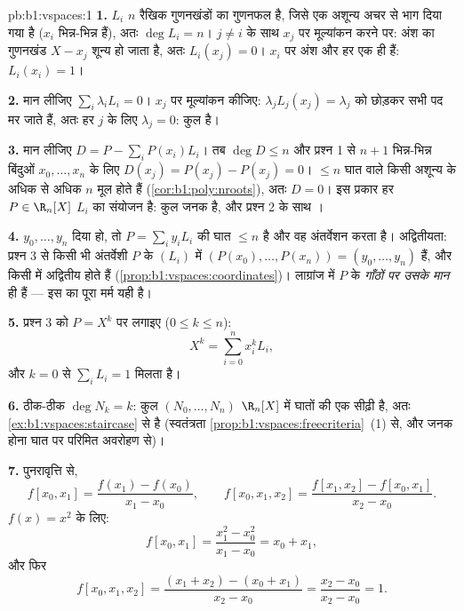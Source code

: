 \begin{solution}{pb:b1:vspaces:1}
\textbf{1.} $L_i$ $n$ रैखिक गुणनखंडों का गुणनफल है, जिसे एक अशून्य अचर से
भाग दिया गया है ($x_i$ भिन्न-भिन्न हैं), अतः $\deg L_i = n$। $j \neq i$ के
साथ $x_j$ पर मूल्यांकन करने पर: अंश का गुणनखंड $X - x_j$ शून्य हो जाता है,
अतः $L_i(x_j) = 0$। $x_i$ पर अंश और हर एक ही हैं: $L_i(x_i) = 1$।

\textbf{2.} मान लीजिए $\sum_i \lambda_i L_i = 0$। $x_j$ पर मूल्यांकन कीजिए:
$\lambda_j L_j(x_j) = \lambda_j$ को छोड़कर सभी पद मर जाते हैं, अतः हर $j$ के
लिए $\lambda_j = 0$: कुल  है।

\textbf{3.} मान लीजिए $D = P - \sum_i P(x_i) L_i$। तब $\deg D \leq n$ और
प्रश्न 1 से $n + 1$ भिन्न-भिन्न बिंदुओं $x_0, \dots, x_n$ के लिए $D(x_j) =
P(x_j) - P(x_j) = 0$। $\leq n$ घात वाले किसी अशून्य  के अधिक से अधिक
$n$ मूल होते हैं (\cref{cor:b1:poly:nroots}), अतः $D = 0$। इस प्रकार हर $P
\in \R_n[X]$ $L_i$ का संयोजन है: कुल जनक है, और प्रश्न 2 के साथ ।

\textbf{4.} $y_0, \dots, y_n$ दिया हो, तो  $P = \sum_i y_i L_i$ की घात
$\leq n$ है और वह अंतर्वेशन करता है। अद्वितीयता: प्रश्न 3 से किसी भी
अंतर्वेशी $P$ के  $(L_i)$ में  $(P(x_0), \dots, P(x_n)) =
(y_0, \dots, y_n)$ हैं, और किसी  में  अद्वितीय होते हैं
(\cref{prop:b1:vspaces:coordinates})। लाग्रांज  में $P$ के 
\emph{गाँठों पर उसके मान} ही हैं --- इस  का पूरा मर्म यही है।

\textbf{5.} प्रश्न 3 को $P = X^k$ पर लगाइए ($0 \leq k \leq n$):
\[
X^k = \sum_{i=0}^{n} x_i^{k} L_i ,
\]
और $k = 0$ से $\sum_i L_i = 1$ मिलता है।

\textbf{6.} ठीक-ठीक $\deg N_k = k$: कुल $(N_0, \dots, N_n)$ $\R_n[X]$ में
घातों की एक सीढ़ी है, अतः \cref{ex:b1:vspaces:staircase} से  है
(स्वतंत्रता \cref{prop:b1:vspaces:freecriteria}~(1) से, और जनक होना घात पर
परिमित अवरोहण से)।

\textbf{7.} पुनरावृत्ति से,
\[
f[x_0, x_1] = \frac{f(x_1) - f(x_0)}{x_1 - x_0},
\qquad
f[x_0, x_1, x_2] = \frac{f[x_1, x_2] - f[x_0, x_1]}{x_2 - x_0}.
\]
$f(x) = x^2$ के लिए:
\[
f[x_0, x_1] = \frac{x_1^2 - x_0^2}{x_1 - x_0} = x_0 + x_1,
\]
और फिर
\[
f[x_0, x_1, x_2]
= \frac{(x_1 + x_2) - (x_0 + x_1)}{x_2 - x_0}
= \frac{x_2 - x_0}{x_2 - x_0} = 1 .
\]


\end{solution}
